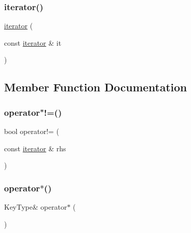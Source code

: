 \mbox{\label{classMap_1_1iterator_a698b7553261e7209d6c29fb55627dce4}} 
\subsubsection{\texorpdfstring{iterator()}{iterator()}\hspace{0.1cm}{\footnotesize\ttfamily [3/3]}}
{\footnotesize\ttfamily \mbox{\hyperlink{classMap_1_1iterator}{iterator}} (\begin{DoxyParamCaption}\item[{const \mbox{\hyperlink{classMap_1_1iterator}{iterator}} \&}]{it }\end{DoxyParamCaption})\hspace{0.3cm}{\ttfamily [inline]}}



\subsection{Member Function Documentation}
\mbox{\label{classMap_1_1iterator_ae1983f2cb0df1f0cbe77ac29590e2e2b}} 
\subsubsection{\texorpdfstring{operator"!=()}{operator!=()}}
{\footnotesize\ttfamily bool operator!= (\begin{DoxyParamCaption}\item[{const \mbox{\hyperlink{classMap_1_1iterator}{iterator}} \&}]{rhs }\end{DoxyParamCaption})\hspace{0.3cm}{\ttfamily [inline]}}

\mbox{\label{classMap_1_1iterator_a26107e2ced3252ee2bf81dd666739da7}} 
\subsubsection{\texorpdfstring{operator$\ast$()}{operator*()}}
{\footnotesize\ttfamily Key\+Type\& operator$\ast$ (\begin{DoxyParamCaption}{ }\end{DoxyParamCaption})\hspace{0.3cm}{\ttfamily [inline]}}

